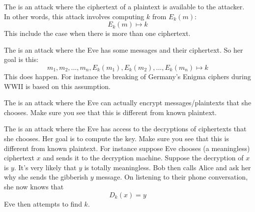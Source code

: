 \begin{myenum}

\item The
  is an attack where the
  ciphertext of a plaintext is available to the attacker. In other words, this
  attack involves computing $k$ from $E_k(m)$:
  \[
  E_k(m) \mapsto k
  \]
  This include the case when there is more than one ciphertext.
  
\item
  The
    is an attack where the
  Eve has some messages and their ciphertext.
  So her goal is this:
  \[
  m_1, m_2, ..., m_n, E_k(m_1), E_k(m_2), ...,  E_k(m_n)  \mapsto k
  \]
  This does happen.
  For instance the breaking of Germany's Enigma ciphers during WWII
  is based on this assumption.
  
\item
  The
   is an attack where the
  Eve can actually encrypt messages/plaintexts that she
  chooses.
  Make sure you see that this is different from known plaintext.
  
\item
  The
  is an attack where the
  Eve has access to the decryptions of ciphertexts that she chooses.
  Her goal is to compute the key.
  Make sure you see that this is different from known plaintext.
  For instance suppose Eve chooses (a meaningless) ciphertext $x$
  and sends it to the decryption machine.
  Suppose the decryption of $x$ is $y$.
  It's very likely that $y$ is totally meaningless.
  Bob then calls Alice and ask her why she sends the gibberish $y$ message.
  On listening to their phone conversation, she now knows that
  \[
  D_k(x) = y
  \]
  Eve then attempts to find $k$.
  
  
\end{myenum}
